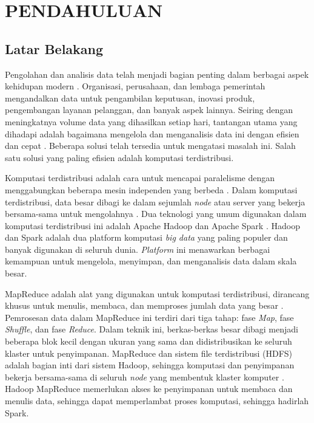 \chapter{PENDAHULUAN}

\pagestyle{plain}

\section{Latar Belakang}

Pengolahan dan analisis data telah menjadi bagian penting dalam berbagai aspek kehidupan modern \cite{vermaBigDataManagement2016}.  Organisasi, perusahaan, dan lembaga pemerintah mengandalkan data untuk pengambilan keputusan, inovasi produk, pengembangan layanan pelanggan, dan banyak aspek lainnya. Seiring dengan meningkatnya volume data yang dihasilkan setiap hari, tantangan utama yang dihadapi adalah bagaimana mengelola dan menganalisis data ini dengan efisien dan cepat \cite{ahmadvandGapproxUsingGallup2019}. Beberapa solusi telah tersedia untuk mengatasi masalah ini. Salah satu solusi yang paling efisien adalah komputasi terdistribusi. 


Komputasi terdistribusi adalah cara untuk mencapai paralelisme dengan menggabungkan beberapa mesin independen yang berbeda \cite{bhattacharyaEvaluatingDistributedComputing2021}. Dalam komputasi terdistribusi, data besar dibagi ke dalam sejumlah \textit{node} atau server yang bekerja bersama-sama untuk mengolahnya \cite{ahmedComprehensivePerformanceAnalysis2020}. Dua teknologi yang umum digunakan dalam komputasi terdistribusi ini adalah Apache Hadoop dan Apache Spark \cite{saputroPerbandinganKinerjaKomputasi2020}. Hadoop dan Spark adalah dua platform komputasi \textit{big data} yang paling populer dan banyak digunakan di seluruh dunia. \textit{Platform} ini menawarkan berbagai kemampuan untuk mengelola, menyimpan, dan menganalisis data dalam skala besar. 

MapReduce adalah alat yang digunakan untuk komputasi terdistribusi, dirancang khusus untuk menulis, membaca, dan memproses jumlah data yang besar \cite{deanMapReduceSimplifiedData2004}. Pemrosesan data dalam MapReduce ini terdiri dari tiga tahap: fase \textit{Map}, fase \textit{Shuffle}, dan fase \textit{Reduce}. Dalam teknik ini, berkas-berkas besar dibagi menjadi beberapa blok kecil dengan ukuran yang sama dan didistribusikan ke seluruh klaster untuk penyimpanan. MapReduce dan sistem file terdistribusi (HDFS) adalah bagian inti dari sistem Hadoop, sehingga komputasi dan penyimpanan bekerja bersama-sama di seluruh \textit{node} yang membentuk klaster komputer \cite{samadiComparativeStudyHadoop2016}. Hadoop MapReduce memerlukan akses ke penyimpanan untuk membaca dan menulis data, sehingga dapat memperlambat proses komputasi, sehingga hadirlah Spark.

